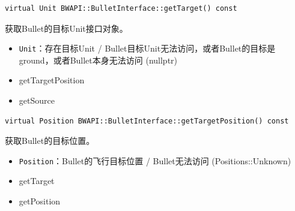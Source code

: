 \begin{tcolorbox}[colback=white, colframe=black!60!white, title=getTarget(), arc=0mm]
    \begin{verbatim}
virtual Unit BWAPI::BulletInterface::getTarget() const
    \end{verbatim}
    获取Bullet的目标Unit接口对象。
    \begin{return}
        \begin{itemize}
            \item \texttt{Unit}：存在目标Unit / Bullet目标Unit无法访问，或者Bullet的目标是ground，或者Bullet本身无法访问 (nullptr)
        \end{itemize}
    \end{return}
    \begin{refer}
        \begin{itemize}
            \item getTargetPosition
            \item getSource
        \end{itemize}
    \end{refer}
\end{tcolorbox}

\begin{tcolorbox}[colback=white, colframe=black!60!white, title=getTargetPosition(), arc=0mm]
    \begin{verbatim}
virtual Position BWAPI::BulletInterface::getTargetPosition() const
    \end{verbatim}
    获取Bullet的目标位置。
    \begin{return}
        \begin{itemize}
            \item \texttt{Position}：Bullet的飞行目标位置 / Bullet无法访问 (Positions::Unknown)
        \end{itemize}
    \end{return}
    \begin{refer}
        \begin{itemize}
            \item getTarget
            \item getPosition
        \end{itemize}
    \end{refer}
\end{tcolorbox}

